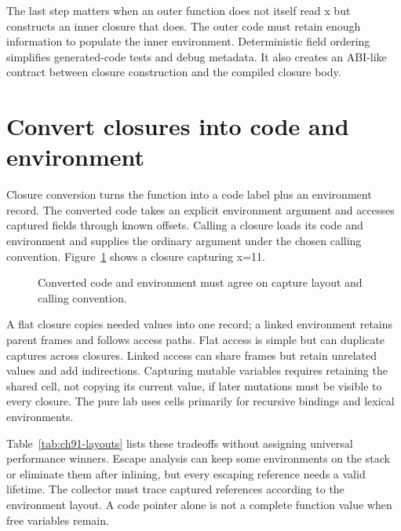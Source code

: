 The last step matters when an outer function does not itself read x but constructs an inner closure that does.
The outer code must retain enough information to populate the inner environment.
Deterministic field ordering simplifies generated-code tests and debug metadata.
It also creates an ABI-like contract between closure construction and the compiled closure body.

\section{Convert closures into code and environment}
\label{sec:ch91-convert}
Closure conversion turns the function into a code label plus an environment record.
The converted code takes an explicit environment argument and accesses captured fields through known offsets.
Calling a closure loads its code and environment and supplies the ordinary argument under the chosen calling convention.
Figure~\ref{fig:ch91-layout} shows a closure capturing x=11.

\begin{figure}[htbp]
\centering
{}
\caption{Converted code and environment must agree on capture layout and calling convention.}
\label{fig:ch91-layout}
\end{figure}

A flat closure copies needed values into one record; a linked environment retains parent frames and follows access paths.
Flat access is simple but can duplicate captures across closures.
Linked access can share frames but retain unrelated values and add indirections.
Capturing mutable variables requires retaining the shared cell, not copying its current value, if later mutations must be visible to every closure.
The pure lab uses cells primarily for recursive bindings and lexical environments.

Table~\ref{tab:ch91-layouts} lists these tradeoffs without assigning universal performance winners.
Escape analysis can keep some environments on the stack or eliminate them after inlining, but every escaping reference needs a valid lifetime.
The collector must trace captured references according to the environment layout.
A code pointer alone is not a complete function value when free variables remain.

